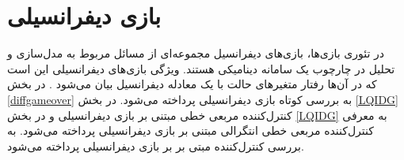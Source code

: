 \chapter{ بازی دیفرانسیلی}
در تئوری بازی‌ها، بازی‌های دیفرانسیل مجموعه‌ای از مسائل مربوط به مدل‌سازی و تحلیل در چارچوب یک سامانه دینامیکی هستند. ویژگی بازی‌های دیفرانسیلی این است که در آن‌ها رفتار متغیرهای حالت با یک معادله دیفرانسیل بیان می‌شود
\cite{diff_game}.
در بخش
\ref{diffgameover}
به بررسی کوتاه بازی دیفرانسیلی پرداخته می‌شود. در بخش
\ref{LQIDG}
کنترل‌کننده مربعی خطی مبتنی بر بازی دیفرانسیلی
و در بخش
\ref{LQIDG}
به معرفی
کنترل‌کننده مربعی خطی انتگرالی مبتنی بر بازی دیفرانسیلی
پرداخته می‌شود.
به بررسی کنترل‌کننده مبتی بر بر بازی دیفرانسیلی پرداخته می‌شود.
